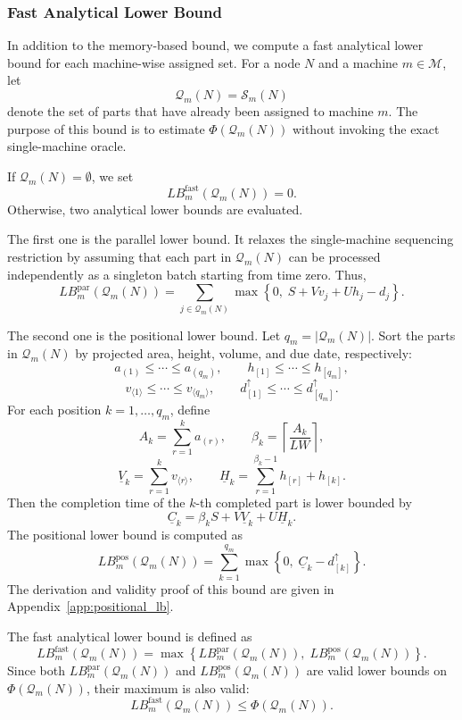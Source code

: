 \documentclass[review,3p,times,authoryear]{elsarticle}
\begin{document}
\subsubsection{Fast Analytical Lower Bound}
\label{subsubsec:fast_analytical_lb}

In addition to the memory-based bound, we compute a fast analytical lower
bound for each machine-wise assigned set. For a node $N$ and a machine
$m\in\mathcal{M}$, let
\[
\mathcal{Q}_m(N)=\mathcal{S}_m(N)
\]
denote the set of parts that have already been assigned to machine $m$.
The purpose of this bound is to estimate
$\Phi(\mathcal{Q}_m(N))$ without invoking the exact single-machine oracle.

If $\mathcal{Q}_m(N)=\emptyset$, we set
\[
LB_m^{\mathrm{fast}}(\mathcal{Q}_m(N))=0.
\]
Otherwise, two analytical lower bounds are evaluated.

The first one is the parallel lower bound. It relaxes the single-machine
sequencing restriction by assuming that each part in $\mathcal{Q}_m(N)$ can
be processed independently as a singleton batch starting from time zero.
Thus,
\[
LB_m^{\mathrm{par}}(\mathcal{Q}_m(N))
=
\sum_{j\in\mathcal{Q}_m(N)}
\max
\left\{
0,\;
S+Vv_j+Uh_j-d_j
\right\}.
\]

The second one is the positional lower bound. Let
$q_m=|\mathcal{Q}_m(N)|$. Sort the parts in $\mathcal{Q}_m(N)$ by projected
area, height, volume, and due date, respectively:
\[
a_{(1)} \le \cdots \le a_{(q_m)},\qquad
h_{[1]} \le \cdots \le h_{[q_m]},
\]
\[
v_{\langle 1\rangle} \le \cdots \le v_{\langle q_m\rangle},\qquad
d_{[1]}^{\uparrow} \le \cdots \le d_{[q_m]}^{\uparrow}.
\]
For each position $k=1,\dots,q_m$, define
\[
A_k=\sum_{r=1}^{k}a_{(r)},
\qquad
\beta_k=\left\lceil\frac{A_k}{LW}\right\rceil,
\]
\[
\underline{V}_k=\sum_{r=1}^{k}v_{\langle r\rangle},
\qquad
\underline{H}_k=
\sum_{r=1}^{\beta_k-1}h_{[r]}+h_{[k]}.
\]
Then the completion time of the $k$-th completed part is lower bounded by
\[
\underline{C}_k
=
\beta_k S
+
V\underline{V}_k
+
U\underline{H}_k.
\]
The positional lower bound is computed as
\[
LB_m^{\mathrm{pos}}(\mathcal{Q}_m(N))
=
\sum_{k=1}^{q_m}
\max
\left\{
0,\;
\underline{C}_k-d_{[k]}^{\uparrow}
\right\}.
\]
The derivation and validity proof of this bound are given in
Appendix~\ref{app:positional_lb}.

The fast analytical lower bound is defined as
\[
LB_m^{\mathrm{fast}}(\mathcal{Q}_m(N))
=
\max
\left\{
LB_m^{\mathrm{par}}(\mathcal{Q}_m(N)),
\;
LB_m^{\mathrm{pos}}(\mathcal{Q}_m(N))
\right\}.
\]
Since both $LB_m^{\mathrm{par}}(\mathcal{Q}_m(N))$ and
$LB_m^{\mathrm{pos}}(\mathcal{Q}_m(N))$ are valid lower bounds on
$\Phi(\mathcal{Q}_m(N))$, their maximum is also valid:
\[
LB_m^{\mathrm{fast}}(\mathcal{Q}_m(N))
\le
\Phi(\mathcal{Q}_m(N)).
\]
\end{document}
